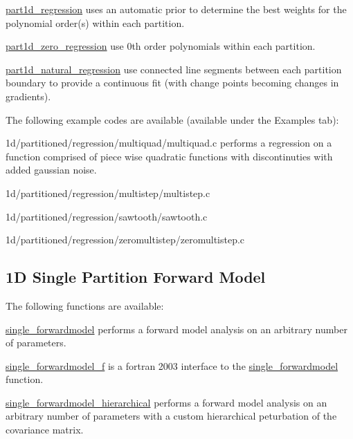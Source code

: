 \begin{DoxyItemize}
\item \hyperlink{regression_8h_a17bc74fa9fb9c6287ab4e19751c6bb17}{part1d\+\_\+regression} uses an automatic prior to determine the best weights for the polynomial order(s) within each partition.
\item \hyperlink{regression_8h_ab17dfbf7aa5a8f0ba54441e7e9dc33cf}{part1d\+\_\+zero\+\_\+regression} use 0th order polynomials within each partition.
\item \hyperlink{regression_8h_abd2a0dc74a4bb3934c21c7864759bbbd}{part1d\+\_\+natural\+\_\+regression} use connected line segments between each partition boundary to provide a continuous fit (with change points becoming changes in gradients).
\end{DoxyItemize}

The following example codes are available (available under the Examples tab)\+:


\begin{DoxyItemize}
\item 1d/partitioned/regression/multiquad/multiquad.\+c performs a regression on a function comprised of piece wise quadratic functions with discontinuties with added gaussian noise.
\item 1d/partitioned/regression/multistep/multistep.\+c
\item 1d/partitioned/regression/sawtooth/sawtooth.\+c
\item 1d/partitioned/regression/zeromultistep/zeromultistep.\+c
\end{DoxyItemize}\hypertarget{index_singlefm1d}{}\subsection{1\+D Single Partition Forward Model}\label{index_singlefm1d}
The following functions are available\+:


\begin{DoxyItemize}
\item \hyperlink{forwardmodel_8h_a65b1200fd2ef808c85b1915fa1413b58}{single\+\_\+forwardmodel} performs a forward model analysis on an arbitrary number of parameters.
\item \hyperlink{forwardmodel__f_8h_a11799898f79291bad341135f00b7a243}{single\+\_\+forwardmodel\+\_\+f} is a fortran 2003 interface to the \hyperlink{forwardmodel_8h_a65b1200fd2ef808c85b1915fa1413b58}{single\+\_\+forwardmodel} function.
\item \hyperlink{forwardmodel_8h_a95b892df15e3e7b58497a68af64a7b0d}{single\+\_\+forwardmodel\+\_\+hierarchical} performs a forward model analysis on an arbitrary number of parameters with a custom hierarchical peturbation of the covariance matrix.
\end{DoxyItemize}

